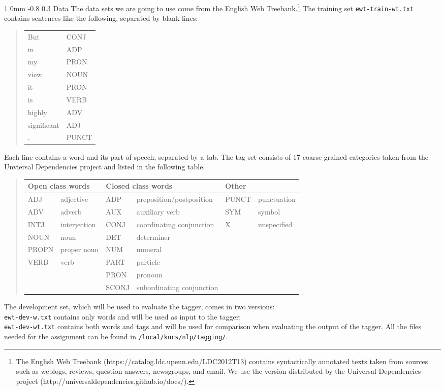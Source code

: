 \documentclass[11pt]{article}
\makeatletter
\newcommand{\newsec}[2]{\section{#1}\label{sec:#2}\noindent}
\renewcommand{\section}{\@startsection
{section}%
{1}%
{0mm}%
{-0.8\baselineskip}%
{0.3\baselineskip}%
{\bfseries\large}}%
\makeatother
\begin{document}
\newsec{Data}{data}%
The data sets we are going to use come from the English Web Treebank.\footnote{The English Web Treebank (https://catalog.ldc.upenn.edu/LDC2012T13)
contains syntactically annotated texts taken from sources such as weblogs, reviews, question-answers, newsgroups, and email. 
We use the version distributed by the Universal Dependencies project (http://universaldependencies.github.io/docs/).} The training set {\tt ewt-train-wt.txt} contains sentences like the following, separated by blank lines:
\begin{quote}
\begin{tt}
\begin{tabular}{ll}
But          &CONJ\\
in            &ADP\\
my            &PRON\\
view          &NOUN\\
it            &PRON\\
is            &VERB\\
highly        &ADV\\
significant   &ADJ\\
.             &PUNCT\\
\end{tabular}
\end{tt}
\end{quote}
Each line contains a word and its part-of-speech, separated by a tab. The tag set consists of 17 coarse-grained categories taken from the Unviersal Dependencies project and listed in the following table.
	\begin{quote}
	\renewcommand{\tabcolsep}{4pt}
	\begin{tabular}{|ll|ll|ll|}
	\hline
	\multicolumn{2}{|l|}{{\bf Open class words}} & \multicolumn{2}{l|}{{\bf Closed class words}} & \multicolumn{2}{l|}{{\bf Other}} \\
	\hline
	ADJ & adjective & ADP & preposition/postposition & PUNCT & punctuation\\
	ADV & adverb & AUX & auxiliary verb & SYM & symbol \\
	INTJ & interjection & CONJ & coordinating conjunction & X & unspecified \\
	NOUN & noun & DET & determiner & & \\
	PROPN & proper noun & NUM & numeral & & \\
	VERB & verb & PART & particle  & & \\
	 & & PRON & pronoun & & \\
	 & & SCONJ & subordinating conjunction & & \\
	\hline
	\end{tabular}
	\end{quote}
The development set, which will be used to evaluate the tagger, comes in two versions:\\ {\tt ewt-dev-w.txt} contains only words and will be used as input to the tagger;\\
{\tt ewt-dev-wt.txt} contains both words and tags and will be used for comparison when evaluating the output of the tagger.
All the files needed for the assignment can be found in {\tt /local/kurs/nlp/tagging/}.
\end{document}
